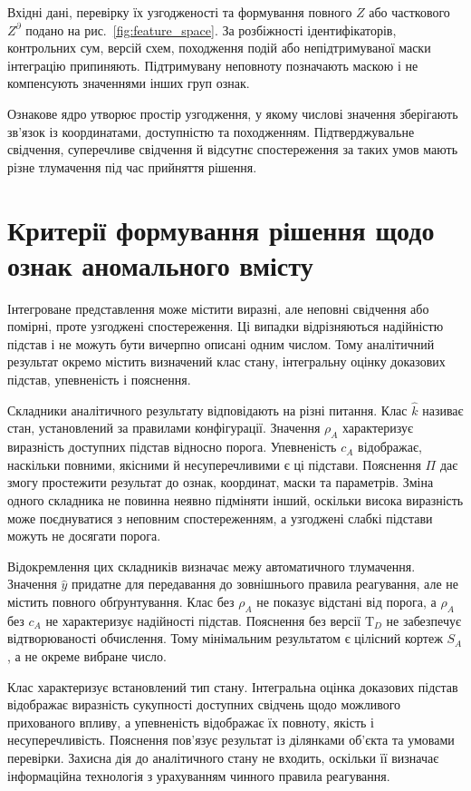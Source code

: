 Вхідні дані, перевірку їх узгодженості та формування повного $Z$ або часткового $Z^{\partial}$ подано на рис.~\ref{fig:feature_space}. За розбіжності ідентифікаторів, контрольних сум, версій схем, походження подій або непідтримуваної маски інтеграцію припиняють. Підтримувану неповноту позначають маскою і не компенсують значеннями інших груп ознак.



Ознакове ядро утворює простір узгодження, у якому числові значення зберігають зв’язок із координатами, доступністю та походженням. Підтверджувальне свідчення, суперечливе свідчення й відсутнє спостереження за таких умов мають різне тлумачення під час прийняття рішення.

\section{Критерії формування рішення щодо ознак аномального вмісту}
\label{sec:decision_criteria}

Інтегроване представлення може містити виразні, але неповні свідчення або помірні, проте узгоджені спостереження. Ці випадки відрізняються надійністю підстав і не можуть бути вичерпно описані одним числом. Тому аналітичний результат окремо містить визначений клас стану, інтегральну оцінку доказових підстав, упевненість і пояснення.

Складники аналітичного результату відповідають на різні питання. Клас $\hat k$ називає стан, установлений за правилами конфігурації. Значення $\rho_A$ характеризує виразність доступних підстав відносно порога. Упевненість $c_A$ відображає, наскільки повними, якісними й несуперечливими є ці підстави. Пояснення $\Pi$ дає змогу простежити результат до ознак, координат, маски та параметрів. Зміна одного складника не повинна неявно підміняти інший, оскільки висока виразність може поєднуватися з неповним спостереженням, а узгоджені слабкі підстави можуть не досягати порога.

Відокремлення цих складників визначає межу автоматичного тлумачення. Значення $\hat y$ придатне для передавання до зовнішнього правила реагування, але не містить повного обґрунтування. Клас без $\rho_A$ не показує відстані від порога, а $\rho_A$ без $c_A$ не характеризує надійності підстав. Пояснення без версії $\mathrm T_D$ не забезпечує відтворюваності обчислення. Тому мінімальним результатом є цілісний кортеж $S_A$, а не окреме вибране число.

Клас характеризує встановлений тип стану. Інтегральна оцінка доказових підстав відображає виразність сукупності доступних свідчень щодо можливого прихованого впливу, а упевненість відображає їх повноту, якість і несуперечливість. Пояснення пов’язує результат із ділянками об’єкта та умовами перевірки. Захисна дія до аналітичного стану не входить, оскільки її визначає інформаційна технологія з урахуванням чинного правила реагування.

